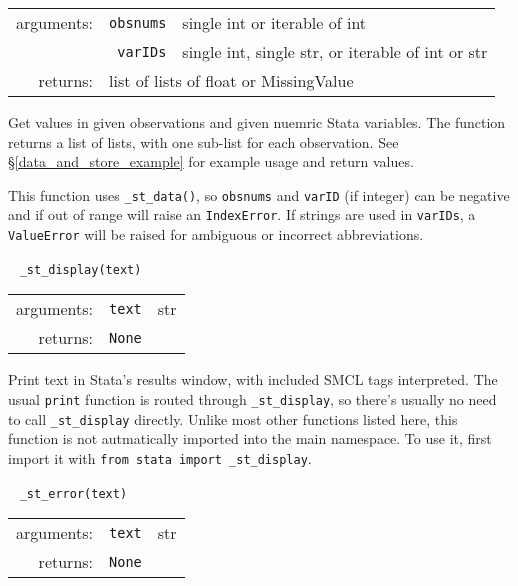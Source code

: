 \documentclass{article}
\begin{document}
			\vspace{1.5mm}
			\noindent 
			\indent \begin{tabular}{rrl}
					arguments: & \texttt{obsnums} & single int or iterable of int \\
					  & \texttt{varIDs} & single int, single str, or iterable of int or str \\
					returns: & \multicolumn{2}{l}{list of lists of float or MissingValue}
				\end{tabular}
								
			\vspace{1.5mm}
			\noindent Get values in given observations and given nuemric Stata variables. The function returns a list of lists, with one sub-list for each observation. See \S\ref{data_and_store_example} for example usage and return values. 
			
			This function uses \lstinline{_st_data()}, so \lstinline{obsnums} and \lstinline{varID} (if integer) can be negative and if out of range will raise an \lstinline{IndexError}. If strings are used in \lstinline{varIDs}, a \lstinline{ValueError} will be raised for ambiguous or incorrect abbreviations. \newline
		
		
			\ \newline
			\noindent \lstinline$_st_display(text)$
								
			\vspace{1.5mm}
			\noindent 
			\indent \begin{tabular}{rrl}
					arguments: & \texttt{text} & str \\
					returns: & \multicolumn{2}{l}{\texttt{None}}
				\end{tabular}
								
			\vspace{1.5mm}
			\noindent Print text in Stata's results window, with included \textsc{SMCL} tags interpreted. The usual \texttt{print} function is routed through \lstinline$_st_display$, so there's usually no need to call \lstinline$_st_display$ directly.  Unlike most other functions listed here, this function is not autmatically imported into the main namespace. To use it, first import it with \lstinline{from stata import _st_display}. \newline
			
			
			\ \newline
			\noindent \lstinline$_st_error(text)$
								
			\vspace{1.5mm}
			\noindent 
			\vspace{-1mm}
			\indent \begin{tabular}{rrl}
					arguments: & \texttt{text} & str \\
					returns: & \multicolumn{2}{l}{\texttt{None}}
				\end{tabular}
								
\end{document}
